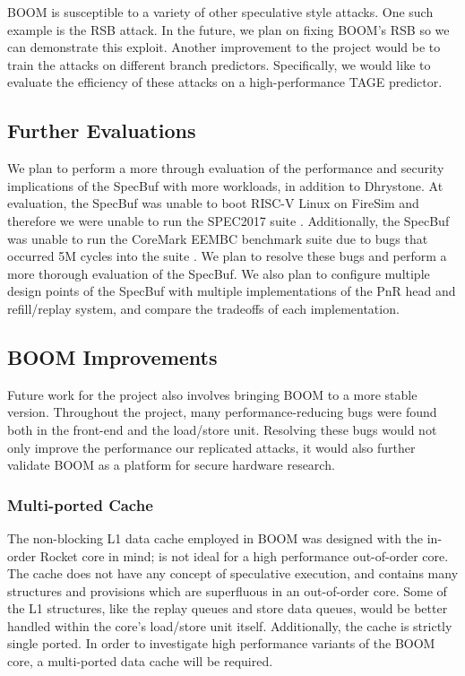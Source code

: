 BOOM is susceptible to a variety of other speculative style attacks. One such example is the RSB
attack. In the future, we plan on fixing BOOM's RSB so we can demonstrate this exploit.
Another improvement to the project would be to train the attacks on different branch predictors.
Specifically, we would like to evaluate the efficiency of these attacks on a high-performance
TAGE predictor.

\subsection{Further Evaluations}

We plan to perform a more through evaluation of the performance and security implications of the
SpecBuf with more workloads, in addition to Dhrystone. At evaluation, the SpecBuf was unable to boot
RISC-V Linux on FireSim and therefore we were unable to run the SPEC2017 suite \cite{b50}.
Additionally, the SpecBuf was unable to run the CoreMark EEMBC benchmark suite due to bugs that
occurred 5M cycles into the suite \cite{b51}. We plan to resolve these bugs and perform a more
thorough evaluation of the SpecBuf. We also plan to configure multiple design
points of the SpecBuf with multiple implementations of the PnR head and refill/replay system, and compare the tradeoffs of each implementation.


\subsection{BOOM Improvements}

Future work for the project also involves bringing BOOM to a more stable version. Throughout
the project, many performance-reducing bugs were found both in the front-end and the 
load/store unit. Resolving these bugs would not only improve the performance our replicated attacks,
it would also further validate BOOM as a platform for secure hardware research.

\subsubsection{Multi-ported Cache}
The non-blocking L1 data cache employed in BOOM was designed with the in-order Rocket core in mind;
is not ideal for a high performance out-of-order core. The cache does not have any concept of
speculative execution, and contains many structures and provisions which are superfluous in an
out-of-order core. Some of the L1 structures, like the replay queues and store data queues, would be
better handled within the core's load/store unit itself.
Additionally, the cache is strictly single ported. In order to investigate high performance variants
of the BOOM core, a multi-ported data cache will be required.

